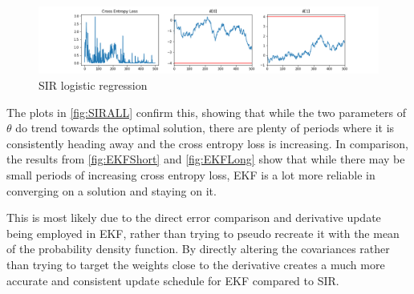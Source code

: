 \documentclass[sigconf]{acmart}
\begin{document}
\begin{figure}[h]
  \centering
  \includegraphics[scale=0.5]{../Part 3/SIRALL.png}
  \caption{SIR logistic regression}
  \label{fig:SIRALL}
\end{figure}

The plots in \autoref{fig:SIRALL} confirm this, showing that while the two parameters of $\theta$ do trend towards the optimal solution, there are plenty of periods where it is consistently heading away and the cross entropy loss is increasing.
In comparison, the results from \autoref{fig:EKFShort} and \autoref{fig:EKFLong} show that while there may be small periods of increasing cross entropy loss, EKF is a lot more reliable in converging on a solution and staying on it.

This is most likely due to the direct error comparison and derivative update being employed in EKF, rather than trying to pseudo recreate it with the mean of the probability density function. By directly altering the covariances rather than trying to target the weights close to the derivative creates a much more accurate and consistent update schedule for EKF compared to SIR.
\pagestyle{myheadings}
\end{document}
